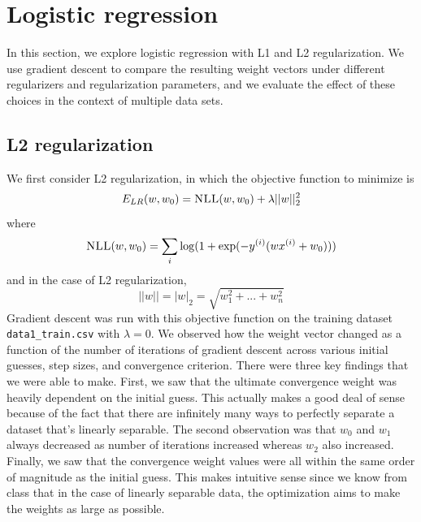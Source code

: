 \documentclass{article}
\begin{document}

\section{Logistic regression}
In this section, we explore logistic regression with L1 and L2 regularization. We use gradient descent to compare the resulting weight vectors under different regularizers and regularization parameters, and we evaluate the effect of these choices in the context of multiple data sets.

\subsection{L2 regularization}
We first consider L2 regularization, in which the objective function to minimize is
$$E_{LR}(w, w_0) = \textsc{NLL}(w, w_0) + \lambda ||w||^2_2$$
where
$$\textsc{NLL}(w, w_0) = \sum_i \log(1 + \exp(-y^{(i)} (w x^{(i)} + w_0)))$$
and in the case of L2 regularization,
$$||w|| = |w|_2 = \sqrt{w_1^2 + ... + w_n^2}$$
Gradient descent was run with this objective function on the training dataset \texttt{data1\_train.csv} with $\lambda = 0$. We observed how the weight vector changed as a function of the number of iterations of gradient descent across various initial guesses, step sizes, and convergence criterion. There were three key findings that we were able to make. First, we saw that the ultimate convergence weight was heavily dependent on the initial guess. This actually makes a good deal of sense because of the fact that there are infinitely many ways to perfectly separate a dataset that's linearly separable. The second observation was that $w_{0}$ and $w_{1}$ always decreased as number of iterations increased whereas $w_{2}$ also increased. Finally, we saw that the convergence weight values were all within the same order of magnitude as the initial guess. This makes intuitive sense since we know from class that in the case of linearly separable data, the optimization aims to make the weights as large as possible. \\
\end{document}
